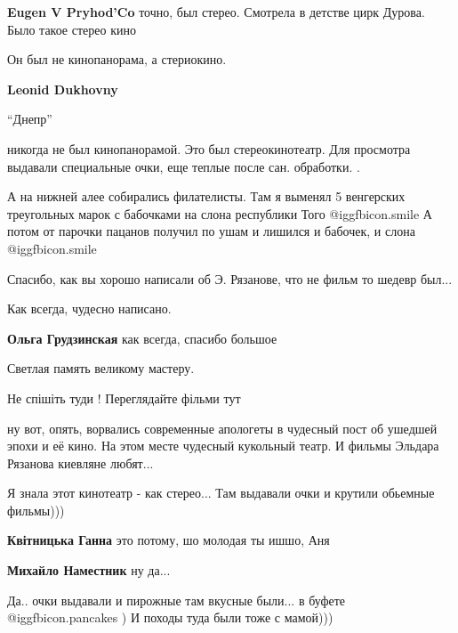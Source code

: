 \begin{itemize}
\begin{itemize}
\begin{itemize}
\textbf{Eugen V Pryhod'Co} точно, был стерео. Смотрела в детстве цирк Дурова. Было такое стерео кино
\end{itemize} %

Он был не кинопанорама, а стериокино.

\textbf{Leonid Dukhovny} 

\enquote{Днепр} 

никогда не был кинопанорамой. Это был стереокинотеатр. Для просмотра выдавали
специальные очки, еще теплые после сан. обработки. .

\end{itemize} %


А на нижней алее собирались филателисты. Там я выменял 5 венгерских треугольных
марок с бабочками на слона республики Того  @igg{fbicon.smile}  А потом от парочки пацанов
получил по ушам и лишился и бабочек, и слона  @igg{fbicon.smile} 


Спасибо, как вы хорошо написали об Э. Рязанове, что не фильм то шедевр был...

Как всегда, чудесно написано.

\begin{itemize} %
\textbf{Ольга Грудзинская} как всегда, спасибо большое
\end{itemize} %

Светлая память великому мастеру.

Не спішіть туди !
Переглядайте фільми тут


ну вот, опять, ворвались современные апологеты в чудесный пост об ушедшей
эпохи и её кино. На этом месте чудесный кукольный театр. И фильмы Эльдара
Рязанова киевляне любят...



Я знала этот кинотеатр - как стерео...
Там выдавали очки и крутили обьемные фильмы)))

\begin{itemize} %
\textbf{Квітницька Ганна} это потому, шо молодая ты ишшо, Аня

\textbf{Михайло Наместник} ну да...

Да.. очки выдавали и пирожные там вкусные были... в буфете @igg{fbicon.pancakes} ) И походы туда были тоже с мамой)))
\end{itemize} %


\end{itemize}
